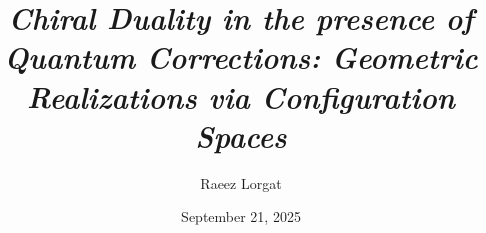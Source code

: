 \documentclass[11pt]{memoir}
\title{\textit{Chiral Duality in the presence of Quantum Corrections: Geometric Realizations via Configuration Spaces}}
\author{Raeez Lorgat}
\date{September 21, 2025}
\begin{document}
\newcommand{\barBgeom}{\bar{\mathbf{B}}}
\newcommand{\barBch}{\bar{B}^{\text{ch}}}       %
\newcommand{\Omegach}{\Omega^{\text{ch}}}       %
\newcommand{\ConfigSpace}[1]{\overline{C}_{#1}(X)}  %
\newcommand{\LogForm}[2]{\eta_{#1#2}}           %
\newcommand{\OPEcoeff}[4]{C_{#1#2}^{#3,#4}}    %
\newcommand{\ChirAlg}{\mathsf{ChirAlg}}         %
\newcommand{\dgCoalg}{\mathsf{dgCoalg}}         %

\newcommand{\ChirHoch}{CH}                      %
\newcommand{\Wakimoto}{\mathcal{M}_{\text{Wak}}} %
\newcommand{\Walg}{\mathcal{W}}                 %
\newcommand{\critLevel}{-h^\vee}                %
\newcommand{\PrimeForm}{E}                      %
\newcommand{\ThetaChar}{\vartheta}              %
\newcommand{\ModularParam}{\tau}                %
\newcommand{\DS}{\text{DS}}                     %




\maketitle
 
\end{document}
